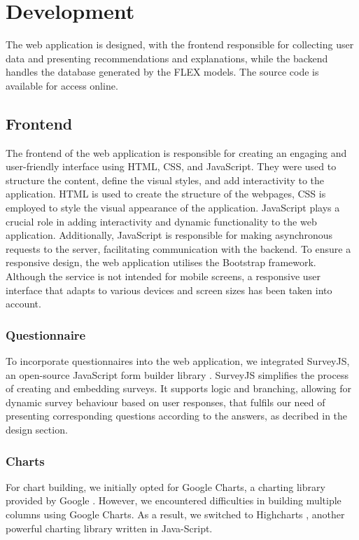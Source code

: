 \chapter{Development}

The web application is designed, 
with the frontend responsible for collecting user data and presenting recommendations and explanations, 
while the backend handles the database generated by the FLEX models. 
The source code \cite{Miao_HERS} is available for access online. 


\section{Frontend}

The frontend of the web application is responsible for creating an engaging and user-friendly interface using HTML, CSS, and JavaScript. 
They were used to structure the content, define the visual styles, and add interactivity to the application.
HTML is used to create the structure of the webpages, CSS is employed to style the visual appearance of the application. 
JavaScript plays a crucial role in adding interactivity and dynamic functionality to the web application. 
Additionally, JavaScript is responsible for making asynchronous requests to the server, facilitating communication with the backend.
To ensure a responsive design, the web application utilises the Bootstrap framework. 
Although the service is not intended for mobile screens, a responsive user interface that adapts to various devices and screen sizes has been taken into account. 


\subsection{Questionnaire}

To incorporate questionnaires into the web application, we integrated SurveyJS, an open-source JavaScript form builder library \cite{surveyjs}. 
SurveyJS simplifies the process of creating and embedding surveys.
It supports logic and branching, allowing for dynamic survey behaviour based on user responses, 
that fulfils our need of presenting corresponding questions according to the answers, as decribed in the design section. 


\subsection{Charts}

For chart building, we initially opted for Google Charts, a charting library provided by Google \cite{googlecharts}. 
However, we encountered difficulties in building multiple columns using Google Charts. 
As a result, we switched to Highcharts \cite{highcharts}, another powerful charting library written in Java-Script. 


